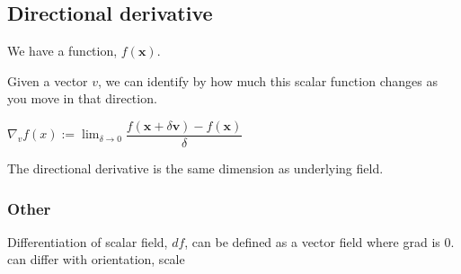 
\subsection{Directional derivative}

We have a function, \(f(\mathbf x)\).

Given a vector \(v\), we can identify by how much this scalar function changes as you move in that direction.

\(\nabla_v f(x):=\lim_{\delta \rightarrow 0}\dfrac{f(\mathbf x+\delta \mathbf v)-f(\mathbf x) }{\delta }\)

The directional derivative is the same dimension as underlying field.

\subsubsection{Other}

Differentiation of scalar field, \(d f\), can be defined as a vector field where grad is 0. can differ with orientation, scale

